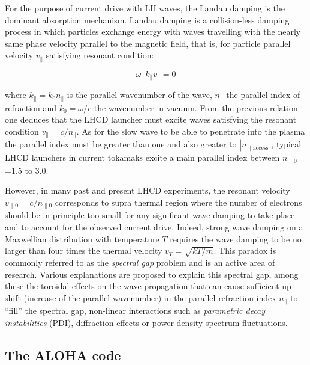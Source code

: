 For the purpose of current drive with LH waves, the Landau damping is the dominant absorption mechanism. Landau damping is a collision-less damping process in which particles exchange energy with waves travelling with the nearly same phase velocity parallel to the magnetic field, that is, for particle parallel velocity $v_{\parallel}$ satisfying resonant condition:

$$\omega – k_{\parallel} v_{\parallel} = 0 $$ 

where $k_{\parallel}=k_0 n_{\parallel}$ is the parallel wavenumber of the wave, $n_{\parallel}$ the parallel index of refraction and $k_0= \omega/c$ the wavenumber in vacuum. From the previous relation one deduces that the LHCD launcher must excite waves satisfying the resonant condition $v_{\parallel}=c/n_{\parallel}$. As for the slow wave to be able to penetrate into the plasma the parallel index must be greater than one and also greater to $|n_{\parallel \mathrm{access}}|$, typical LHCD launchers in current tokamaks excite a main parallel index between $n_{\parallel 0}$=1.5 to 3.0. 

However, in many past and present LHCD experiments, the resonant velocity $v_{\parallel 0}=c/n_{\parallel 0}$ corresponds to supra thermal region where the number of electrons should be in principle too small for any significant wave damping to take place and to account for the observed current drive. Indeed, strong wave damping on a Maxwellian distribution with temperature $T$ requires the wave damping to be no larger than four times the thermal velocity $v_T=\sqrt{k T/m}$. This paradox is commonly referred to as the \emph{spectral gap} problem and is an active area of research. Various explanations are proposed to explain this spectral gap, among these the toroidal effects on the wave propagation that can cause sufficient up-shift (increase of the parallel wavenumber) in the parallel refraction index $n_{\parallel}$ to “fill” the spectral gap, non-linear interactions such as \textit{parametric decay instabilities} (PDI), diffraction effects or power density spectrum fluctuations. 

\subsection{The ALOHA code}\label{sec:ALOHA}




